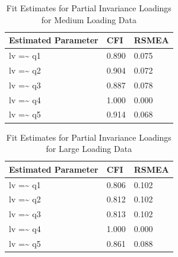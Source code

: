 \documentclass[
  man]{apa7}
\begin{document}
\begin{table}[tbp]

\begin{center}
\begin{threeparttable}

\caption{\label{tab:p-tab13}Fit Estimates for Partial Invariance Loadings for Medium Loading Data}

\begin{tabular}{lll}
\toprule
Estimated Parameter & CFI & RSMEA\\
\midrule
lv =\textasciitilde{} q1 & 0.890 & 0.075\\
lv =\textasciitilde{} q2 & 0.904 & 0.072\\
lv =\textasciitilde{} q3 & 0.887 & 0.078\\
lv =\textasciitilde{} q4 & 1.000 & 0.000\\
lv =\textasciitilde{} q5 & 0.914 & 0.068\\
\bottomrule
\end{tabular}

\end{threeparttable}
\end{center}

\end{table}

\begin{table}[tbp]

\begin{center}
\begin{threeparttable}

\caption{\label{tab:p-tab14}Fit Estimates for Partial Invariance Loadings for Large Loading Data}

\begin{tabular}{lll}
\toprule
Estimated Parameter & CFI & RSMEA\\
\midrule
lv =\textasciitilde{} q1 & 0.806 & 0.102\\
lv =\textasciitilde{} q2 & 0.812 & 0.102\\
lv =\textasciitilde{} q3 & 0.813 & 0.102\\
lv =\textasciitilde{} q4 & 1.000 & 0.000\\
lv =\textasciitilde{} q5 & 0.861 & 0.088\\
\bottomrule
\end{tabular}

\end{threeparttable}
\end{center}

\end{table}
\end{document}
